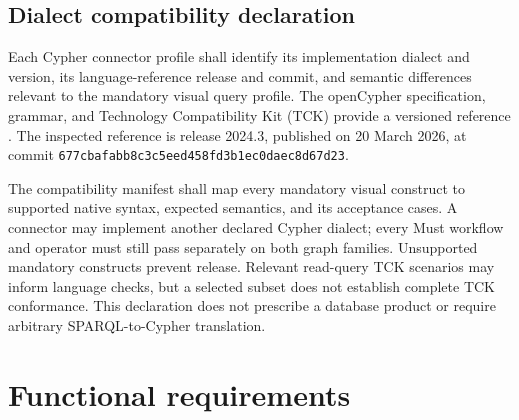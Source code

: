 \documentclass[11pt,a4paper]{article}
\begin{document}
\subsection{Dialect compatibility declaration}
Each Cypher connector profile shall identify its implementation dialect and version, its language-reference release and commit, and semantic differences relevant to the mandatory visual query profile. The openCypher specification, grammar, and Technology Compatibility Kit (TCK) provide a versioned reference \citep{opencypher}. The inspected reference is release 2024.3, published on 20 March 2026, at commit \texttt{677cbafabb8c3c5eed458fd3b1ec0daec8d67d23}.

The compatibility manifest shall map every mandatory visual construct to supported native syntax, expected semantics, and its acceptance cases. A connector may implement another declared Cypher dialect; every Must workflow and operator must still pass separately on both graph families. Unsupported mandatory constructs prevent release. Relevant read-query TCK scenarios may inform language checks, but a selected subset does not establish complete TCK conformance. This declaration does not prescribe a database product or require arbitrary SPARQL-to-Cypher translation.

\section{Functional requirements}
\end{document}
